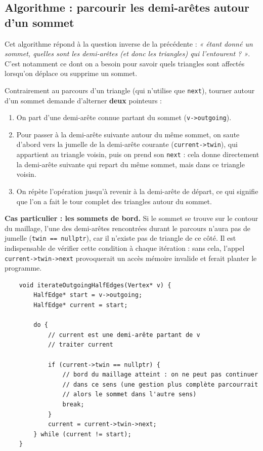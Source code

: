 \subsection{Algorithme : parcourir les demi-arêtes autour d'un sommet}

Cet algorithme répond à la question inverse de la précédente :
\emph{« étant donné un sommet, quelles sont les demi-arêtes (et donc
	les triangles) qui l'entourent ? »}. C'est notamment ce dont on a
besoin pour savoir quels triangles sont affectés lorsqu'on déplace ou
supprime un sommet.

Contrairement au parcours d'un triangle (qui n'utilise que
\texttt{next}), tourner autour d'un sommet demande d'alterner
\textbf{deux} pointeurs :

\begin{enumerate}
	\item On part d'une demi-arête connue partant du sommet
	(\texttt{v->outgoing}).
	\item Pour passer à la demi-arête suivante autour du même sommet,
	on saute d'abord vers la jumelle de la demi-arête courante
	(\texttt{current->twin}), qui appartient au triangle voisin, puis
	on prend son \texttt{next} : cela donne directement la demi-arête
	suivante qui repart du même sommet, mais dans ce triangle voisin.
	\item On répète l'opération jusqu'à revenir à la demi-arête de
	départ, ce qui signifie que l'on a fait le tour complet des
	triangles autour du sommet.
\end{enumerate}

\textbf{Cas particulier : les sommets de bord.} Si le sommet se trouve
sur le contour du maillage, l'une des demi-arêtes rencontrées durant
le parcours n'aura pas de jumelle (\texttt{twin == nullptr}), car il
n'existe pas de triangle de ce côté. Il est indispensable de vérifier
cette condition à chaque itération : sans cela, l'appel
\texttt{current->twin->next} provoquerait un accès mémoire invalide
et ferait planter le programme.

\begin{verbatim}
	void iterateOutgoingHalfEdges(Vertex* v) {
		HalfEdge* start = v->outgoing;
		HalfEdge* current = start;
		
		do {
			// current est une demi-arête partant de v
			// traiter current
			
			if (current->twin == nullptr) {
				// bord du maillage atteint : on ne peut pas continuer
				// dans ce sens (une gestion plus complète parcourrait
				// alors le sommet dans l'autre sens)
				break;
			}
			current = current->twin->next;
		} while (current != start);
	}
\end{verbatim}

